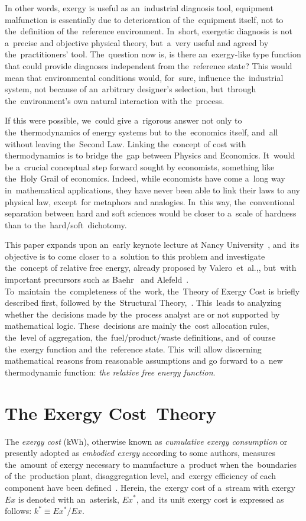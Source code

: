 \documentclass[energies,article,accept,moreauthors,pdftex]{Definitions/mdpi}
\begin{document}
In other words, exergy is useful as an~industrial diagnosis tool, equipment malfunction is essentially due to deterioration of the~equipment itself, not to the~definition of the~reference environment. In~short, exergetic diagnosis is not a~precise and objective physical theory, but~a~very useful and agreed by the~practitioners’ tool. The~question now is, is there an~exergy-like type function that could provide diagnoses independent from the~reference state? This would mean that environmental conditions would, for~sure, influence the~industrial system, not because of an~arbitrary designer's selection, but~through the~environment's own natural interaction with the~process.

If this were possible, we~could give a~rigorous answer not only to the~thermodynamics of energy systems but to the~economics itself, and~all without leaving the~Second Law. Linking the~concept of cost with thermodynamics is to bridge the~gap between Physics and Economics. It~would be a~crucial conceptual step forward sought by economists, something like the~Holy Grail of economics. Indeed, while economists have come a~long way in~mathematical applications, they have never been able to link their laws to any physical law, except~for metaphors and analogies. In~this way, the~conventional separation between hard and soft sciences would be closer to a~scale of hardness than to the~hard/soft~dichotomy.

This paper expands upon an~early keynote lecture at Nancy University~\cite{Valero2018}, and~its objective is to come closer to a~solution to this problem and investigate the~concept of relative free energy, already proposed by Valero~et~al.,\cite{Valero1992b}, but~with important precursors such as Baehr~\cite{Baehr2005} and Alefeld~\cite{Alefeld1988}. To~maintain~the~completeness of the~work, the~Theory of Exergy Cost is briefly described first, followed by the~Structural Theory,~\cite{Valero1992a}. This~leads to analyzing whether the~decisions made by the~process analyst are or not supported by mathematical logic. These~decisions are mainly the~cost allocation rules, the~level of aggregation, the~fuel/product/waste definitions, and~of course the~exergy function and the~reference state. This~will allow discerning mathematical reasons from reasonable assumptions and go forward to a~new thermodynamic function: \emph{the relative free energy function}.

\section{The Exergy Cost~Theory}
The \emph{exergy cost} (kWh), otherwise known as \emph{cumulative exergy consumption} \cite{Morris1986,Szargut1988} or presently adopted as \emph{embodied exergy} according to some authors, measures the~amount of exergy necessary to manufacture a~product when the~boundaries of the~production plant, disaggregation level, and~exergy efficiency of each component have been defined~\cite{Valero1986a,Lozano1993}. Herein, the~exergy cost of a~stream with exergy $Ex$ is denoted with an~asterisk, $Ex^*$, and~its unit exergy cost is expressed as follows: $k^*\equiv Ex^*/Ex$.
\end{document}
